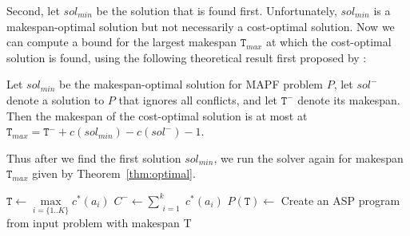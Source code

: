 Second, let $sol_{min}$ be the solution that is found first. Unfortunately, $sol_{min}$ is a makespan-optimal solution but not necessarily a cost-optimal solution. Now we can compute a bound for the largest makespan $\mathtt{T}_{max}$ at which the cost-optimal solution is found, using the following theoretical result first proposed by :
\begin{theorem}\label{thm:optimal}
Let $sol_{min}$ be the makespan-optimal solution for MAPF problem $P$, let $sol^-$ denote a solution to $P$ that ignores all conflicts, and let $\mathtt{T}^-$ denote its makespan. Then the makespan of the cost-optimal solution is at most at $\mathtt{T}_{max}=\mathtt{T}^- + c(sol_{min})-c(sol^-)-1$.
\end{theorem}
Thus after we find the first solution $sol_{min}$, we run the solver again for makespan $\mathtt{T}_{max}$ given by Theorem~\ref{thm:optimal}.







 \begin{algorithm}
 \DontPrintSemicolon
 $\mathtt{T} \gets \max\limits_{i=\{1..K\} }{c^*(a_i)}$\;
 $C^- \gets \sum_{\substack{i=1}}^{k} c^*(a_i)$\;
 $P(\mathtt{T}) \gets$ Create an ASP program from input problem with makespan T\;%

\end{algorithm}
